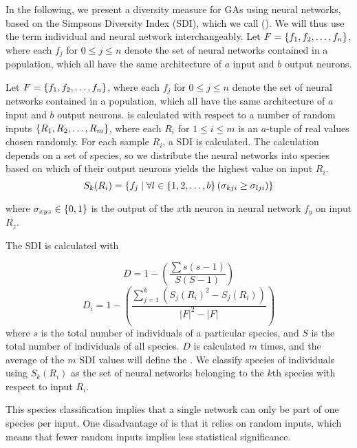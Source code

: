 \section{\di{}}
In the following, we present a diversity measure for GAs using neural networks, based on the Simpsons Diversity Index (SDI), which we call \di{} (\dia{}). We will thus use the term individual and neural network interchangeably. Let $F = \left\{ f_1, f_2, \dots, f_n \right\}$, where each $f_j$ for $0 \leq j \leq n$ denote the set of neural networks contained in a population, which all have the same architecture of $a$ input and $b$ output neurons. 

Let $F = \left\{ f_1, f_2, \dots, f_n \right\}$, where each $f_j$ for $0 \leq j \leq n$ denote the set of neural networks contained in a population, which all have the same architecture of $a$ input and $b$ output neurons. \dia{} is calculated with respect to a number of random inputs $\left\{ R_1, R_2, \dots, R_m \right\}$, where each $R_i$ for $1 \leq i \leq m$ is an $a$-tuple of real values chosen randomly. For each sample $R_i$, a SDI is calculated. The calculation depends on a set of species, so we distribute the neural networks into species based on which of their output neurons yields the highest value on input $R_i$. %
%
\begin{equation*}\label{eq:species}
  S_k(R_i) = \left\{ f_j \mid \forall l \in \left\{ 1, 2, \dots, b \right\} \left(\sigma_{kji} \geq \sigma_{lji}\right) \right\}
\end{equation*}
%

where $\sigma_{xyz} \in \left\{ 0, 1 \right\}$ is the output of the $x$th neuron in neural network $f_y$ on input $R_z$.

The SDI is calculated with

\begin{equation*}\label{eq:sdi}
  D = 1 - \left(\frac{\sum{s (s - 1)}}{S (S - 1)}\right) 
\end{equation*}
%
\begin{equation*}\label{eq:sdi2}
  D_i = 1 - \left(\frac{\sum_{j=1}^{k}\left(S_j\left(R_i\right)^2 - S_j(R_i)\right)}{\lvert F\rvert^2 - \lvert F\rvert}\right) 
\end{equation*}
%
where $s$ is the total number of individuals of a particular species, and $S$ is the total number of individuals of all species. $D$ is calculated $m$ times, and the average of the $m$ SDI values will define the \dia{}. We classify species of individuals using $S_k(R_i)$ as the set of neural networks belonging to the $k$th species with respect to input $R_i$.

This species classification implies that a single network can only be part of one species per input. One disadvantage of \dia{} is that it relies on random inputs, which means that fewer random inputs implies less statistical significance.
